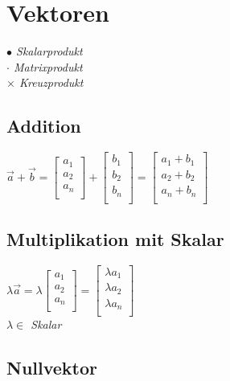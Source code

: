 \section{Vektoren}

\textit{$\bullet$ Skalarprodukt} \\
\textit{$\cdot$ Matrixprodukt} \\
\textit{$\times$ Kreuzprodukt}

\subsection{Addition}

$\vec{a} + \vec{b} = \begin{bmatrix}
    a_1 \\
    a_2 \\
    a_n \\
\end{bmatrix} + \begin{bmatrix}
    b_1 \\
    b_2 \\
    b_n \\
\end{bmatrix} = \begin{bmatrix}
    a_1 + b_1 \\
    a_2 + b_2 \\
    a_n + b_n \\
\end{bmatrix}$

\subsection{Multiplikation mit Skalar}

$\lambda \vec{a} = \lambda\begin{bmatrix}
    a_1 \\
    a_2 \\
    a_n \\
\end{bmatrix} = \begin{bmatrix}
    \lambda a_1 \\
    \lambda a_2 \\
    \lambda a_n \\
\end{bmatrix}$ \\

\textit{$\lambda \in$ Skalar}

\subsection{Nullvektor}

